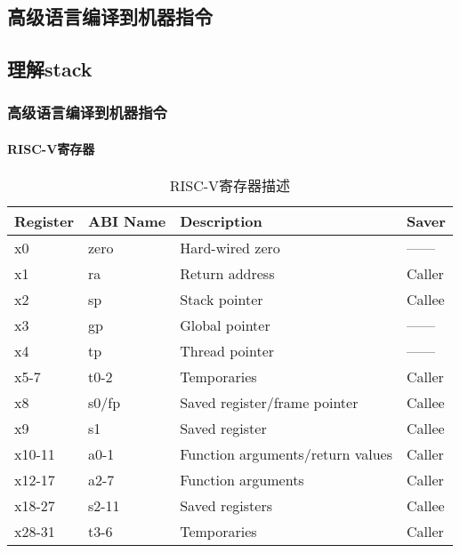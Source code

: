 \subsection{高级语言编译到机器指令} %
\subsection{理解stack}

\begin{frame}
	
	\frametitle{高级语言编译到机器指令}
	\framesubtitle{RISC-V寄存器}	
\begin{table}[h]
		\caption{RISC-V寄存器描述}
		\begin{tabular}{|l|l|l|l|}
			\hline
			Register & ABI Name & Description                      & Saver  \\\hline
			x0       & zero     & Hard-wired zero                  & ------ \\\hline
			x1       & ra       & Return address                   & Caller \\\hline
			x2       & sp       & Stack pointer                    & Callee \\\hline
			x3       & gp       & Global pointer                   & ------ \\\hline
			x4       & tp       & Thread pointer                   & ------ \\\hline
			x5-7     & t0-2     & Temporaries                      & Caller \\\hline
			x8       & s0/fp    & Saved register/frame pointer     & Callee \\\hline
			x9       & s1       & Saved register                   & Callee \\\hline
			x10-11   & a0-1     & Function arguments/return values & Caller \\\hline
			x12-17   & a2-7     & Function arguments               & Caller \\\hline
			x18-27   & s2-11    & Saved registers                  & Callee \\\hline
			x28-31   & t3-6     & Temporaries                      & Caller \\
			\hline
		\end{tabular}
\end{table}

\end{frame}



